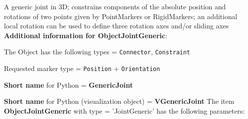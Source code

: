 \label{sec:item:ObjectJointGeneric}
A generic joint in 3D; constrains components of the absolute position and rotations of two points given by PointMarkers or RigidMarkers; an additional local rotation can be used to define three rotation axes and/or sliding axes\vspace{12pt}
 \\{\bf Additional information for ObjectJointGeneric}:
\bi
  \item The Object has the following types = \texttt{Connector}, \texttt{Constraint}
  \item Requested marker type = \texttt{Position} + \texttt{Orientation}
  \item {\bf Short name} for Python = {\bf GenericJoint}  \item {\bf Short name} for Python (visualization object) = {\bf VGenericJoint}\ei
\vspace{12pt} \noindent The item {\bf ObjectJointGeneric} with type = 'JointGeneric' has the following parameters:\vspace{-1cm}\\ 
